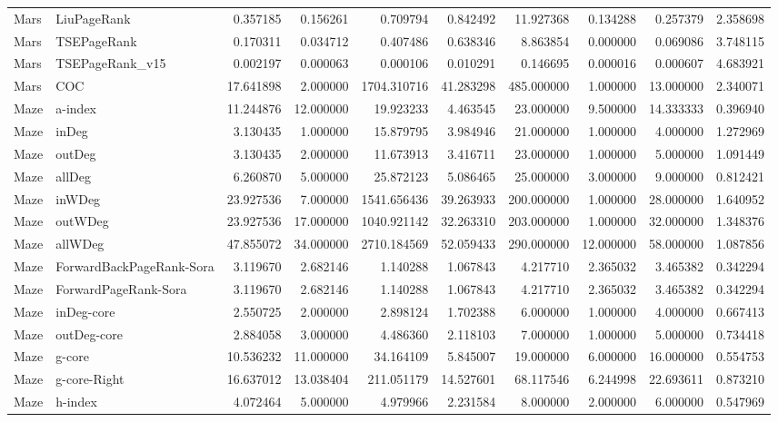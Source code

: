 \begin{tabular}{llrrrrrrrr}
Mars & LiuPageRank & 0.357185 & 0.156261 & 0.709794 & 0.842492 & 11.927368 & 0.134288 & 0.257379 & 2.358698 \\
Mars & TSEPageRank & 0.170311 & 0.034712 & 0.407486 & 0.638346 & 8.863854 & 0.000000 & 0.069086 & 3.748115 \\
Mars & TSEPageRank_v15 & 0.002197 & 0.000063 & 0.000106 & 0.010291 & 0.146695 & 0.000016 & 0.000607 & 4.683921 \\
Mars & COC & 17.641898 & 2.000000 & 1704.310716 & 41.283298 & 485.000000 & 1.000000 & 13.000000 & 2.340071 \\
Maze & a-index & 11.244876 & 12.000000 & 19.923233 & 4.463545 & 23.000000 & 9.500000 & 14.333333 & 0.396940 \\
Maze & inDeg & 3.130435 & 1.000000 & 15.879795 & 3.984946 & 21.000000 & 1.000000 & 4.000000 & 1.272969 \\
Maze & outDeg & 3.130435 & 2.000000 & 11.673913 & 3.416711 & 23.000000 & 1.000000 & 5.000000 & 1.091449 \\
Maze & allDeg & 6.260870 & 5.000000 & 25.872123 & 5.086465 & 25.000000 & 3.000000 & 9.000000 & 0.812421 \\
Maze & inWDeg & 23.927536 & 7.000000 & 1541.656436 & 39.263933 & 200.000000 & 1.000000 & 28.000000 & 1.640952 \\
Maze & outWDeg & 23.927536 & 17.000000 & 1040.921142 & 32.263310 & 203.000000 & 1.000000 & 32.000000 & 1.348376 \\
Maze & allWDeg & 47.855072 & 34.000000 & 2710.184569 & 52.059433 & 290.000000 & 12.000000 & 58.000000 & 1.087856 \\
Maze & ForwardBackPageRank-Sora & 3.119670 & 2.682146 & 1.140288 & 1.067843 & 4.217710 & 2.365032 & 3.465382 & 0.342294 \\
Maze & ForwardPageRank-Sora & 3.119670 & 2.682146 & 1.140288 & 1.067843 & 4.217710 & 2.365032 & 3.465382 & 0.342294 \\
Maze & inDeg-core & 2.550725 & 2.000000 & 2.898124 & 1.702388 & 6.000000 & 1.000000 & 4.000000 & 0.667413 \\
Maze & outDeg-core & 2.884058 & 3.000000 & 4.486360 & 2.118103 & 7.000000 & 1.000000 & 5.000000 & 0.734418 \\
Maze & g-core & 10.536232 & 11.000000 & 34.164109 & 5.845007 & 19.000000 & 6.000000 & 16.000000 & 0.554753 \\
Maze & g-core-Right & 16.637012 & 13.038404 & 211.051179 & 14.527601 & 68.117546 & 6.244998 & 22.693611 & 0.873210 \\
Maze & h-index & 4.072464 & 5.000000 & 4.979966 & 2.231584 & 8.000000 & 2.000000 & 6.000000 & 0.547969 \\

\end{tabular}
